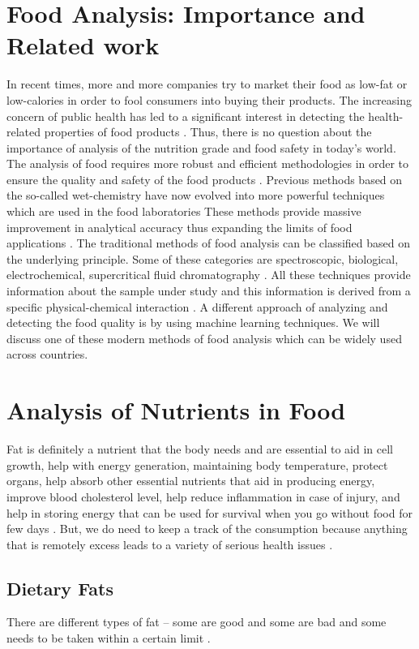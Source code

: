 \documentclass[sigconf]{acmart}
\begin{document}
\section{Food Analysis: Importance and Related work}
In recent times, more and more companies try to market their food as low-fat or low-calories in order to fool consumers into buying their products. The increasing concern of public health has led to a significant interest in detecting the health-related properties of food products  \cite{cifuentes2012food}. Thus, there is no question about the importance of analysis of the nutrition grade and food safety in today's world. The analysis of food requires more robust and efficient methodologies in order to ensure the quality and safety of the food products \cite{cifuentes2012food}. Previous methods based on the so-called wet-chemistry have now evolved into more powerful techniques which are used in the food laboratories These methods provide massive improvement in analytical accuracy thus expanding the limits of food applications \cite{cifuentes2012food}. The traditional methods of food analysis can be classified based on the underlying principle. Some of these categories are spectroscopic, biological, electrochemical, supercritical fluid chromatography \cite{cifuentes2012food}. All these techniques provide information about the sample under study and this information is derived from a specific physical-chemical interaction \cite{cifuentes2012food}. A different approach of analyzing and detecting the food quality is by using machine learning techniques. We will discuss one of these modern methods of food analysis which can be widely used across countries.


\section{Analysis of Nutrients in Food}
Fat is definitely a nutrient that the body needs and are essential to aid in cell growth, help with energy generation, maintaining body temperature, protect organs, help absorb other essential nutrients that aid in producing energy, improve blood cholesterol level, help reduce inflammation in case of injury, and help in storing energy that can be used for survival when you go without food for few days \cite{www-health}. But, we do need to keep a track of the consumption because anything that is remotely excess leads to a variety of serious health issues \cite{www-health}.  

\subsection{Dietary Fats}
There are different types of fat – some are good and some are bad and some needs to be taken within a certain limit \cite{www-health}. 
\end{document}
